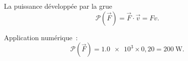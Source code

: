 La puissance développée par la grue
\[
    \mathcal{P}(\vec{F})=\vec{F}\cdot \vec{v}=Fv.
\]

Application numérique~:
\[
    \mathcal{P}(\vec{F})=\num{1.0e3}\times0,20=\qty{200}{\W}.
\]

